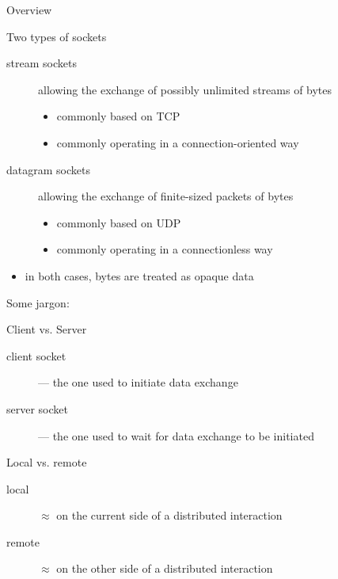\documentclass[presentation]{beamer}\mode<presentation>{\usetheme{AMSBolognaFC}}
\begin{document}
\begin{frame}[c, allowframebreaks]{Overview}
\begin{description}
    \end{description}

    \framebreak

    \begin{block}{Two types of sockets}
        \begin{description}
            \item[stream sockets] allowing the exchange of \alert{possibly unlimited streams} of bytes
            \begin{itemize}\small
                \item commonly based on TCP
                \item commonly operating in a \alert{connection-oriented} way
            \end{itemize}

            \item[datagram sockets] allowing the exchange of \alert{finite-sized packets} of bytes
            \begin{itemize}\small
                \item commonly based on UDP
                \item commonly operating in a \alert{connectionless} way
            \end{itemize}
        \end{description}

        \smallskip

        \begin{itemize}
            \item in both cases, bytes are treated as \alert{opaque data}
        \end{itemize}
    \end{block}

    \framebreak

    Some jargon:

    \bigskip

    \begin{block}{Client vs. Server}
        \begin{description}
            \item[client socket] --- the one used to \alert{initiate} data exchange
            \item[server socket] --- the one used to \alert{wait} for data exchange to be initiated
        \end{description}
    \end{block}

    \bigskip

    \begin{block}{Local vs. remote}
        \begin{description}
            \item[local] $\approx$ on the \alert{current} side of a distributed interaction
            \item[remote] $\approx$ on the \alert{other} side of a distributed interaction
        \end{description}
    \end{block}
\end{frame}
\end{document}
